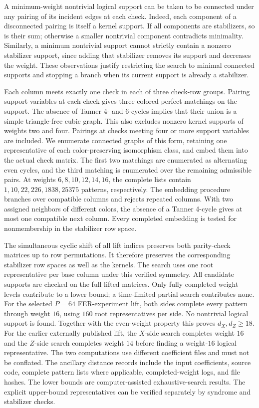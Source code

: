 \documentclass[11pt,a4paper]{article}
\theoremstyle{uprighttheorem}
\begin{document}
A minimum-weight nontrivial logical support can be taken to be connected under any pairing of its incident edges at each check.
Indeed, each component of a disconnected pairing is itself a kernel support.
If all components are stabilizers, so is their sum; otherwise a smaller nontrivial component contradicts minimality.
Similarly, a minimum nontrivial support cannot strictly contain a nonzero stabilizer support, since adding that stabilizer removes its support and decreases the weight.
These observations justify restricting the search to minimal connected supports and stopping a branch when its current support is already a stabilizer.

Each column meets exactly one check in each of three check-row groups.
Pairing support variables at each check gives three colored perfect matchings on the support.
The absence of Tanner 4- and 6-cycles implies that their union is a simple triangle-free cubic graph.
This also excludes nonzero kernel supports of weights two and four.
Pairings at checks meeting four or more support variables are included.
We enumerate connected graphs of this form, retaining one representative of each color-preserving isomorphism class, and embed them into the actual check matrix.
The first two matchings are enumerated as alternating even cycles, and the third matching is enumerated over the remaining admissible pairs.
At weights $6,8,10,12,14,16$, the complete lists contain
$1,10,22,226,1838,25375$ patterns, respectively.
The embedding procedure branches over compatible columns and rejects repeated columns.
With two assigned neighbors of different colors, the absence of a Tanner 4-cycle gives at most one compatible next column.
Every completed embedding is tested for nonmembership in the stabilizer row space.

The simultaneous cyclic shift of all lift indices preserves both parity-check matrices up to row permutations.
It therefore preserves the corresponding stabilizer row spaces as well as the kernels.
The search uses one root representative per base column under this verified symmetry.
All candidate supports are checked on the full lifted matrices.
Only fully completed weight levels contribute to a lower bound; a time-limited partial search contributes none.
For the selected $P=64$ FER-experiment lift, both sides complete every pattern through weight $16$, using $160$ root representatives per side. No nontrivial logical support is found. Together with the even-weight property this proves $d_X,d_Z\ge18$.
For the earlier externally published lift, the $X$-side search completes weight $16$ and the $Z$-side search completes weight $14$ before finding a weight-$16$ logical representative. The two computations use different coefficient files and must not be conflated.
The ancillary distance records include the input coefficients, source code, complete pattern lists where applicable, completed-weight logs, and file hashes.
The lower bounds are computer-assisted exhaustive-search results.
The explicit upper-bound representatives can be verified separately by syndrome and stabilizer checks.


\begingroup
\raggedright


\endgroup
\end{document}
